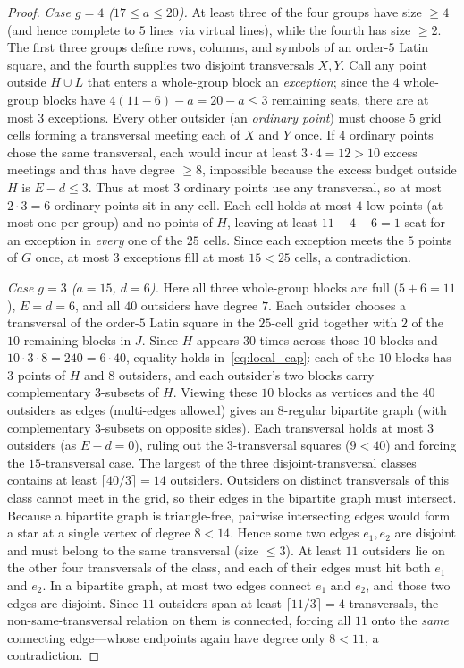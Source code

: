 \documentclass[11pt,a4paper]{article}
\theoremstyle{definition}
\theoremstyle{remark}
\begin{document}
\begin{proof}
\emph{Case $g = 4$ ($17 \le a \le 20$).} At least three of the four groups have size $\ge 4$ (and hence complete to $5$ lines via virtual lines), while the fourth has size $\ge 2$. The first three groups define rows, columns, and symbols of an order-$5$ Latin square, and the fourth supplies two disjoint transversals $X, Y$. Call any point outside $H \cup L$ that enters a whole-group block an \emph{exception}; since the $4$ whole-group blocks have $4(11-6) - a = 20 - a \le 3$ remaining seats, there are at most $3$ exceptions. Every other outsider (an \emph{ordinary point}) must choose $5$ grid cells forming a transversal meeting each of $X$ and $Y$ once. If $4$ ordinary points chose the same transversal, each would incur at least $3 \cdot 4 = 12 > 10$ excess meetings and thus have degree $\ge 8$, impossible because the excess budget outside $H$ is $E - d \le 3$. Thus at most $3$ ordinary points use any transversal, so at most $2 \cdot 3 = 6$ ordinary points sit in any cell. Each cell holds at most $4$ low points (at most one per group) and no points of $H$, leaving at least $11 - 4 - 6 = 1$ seat for an exception in \emph{every} one of the $25$ cells. Since each exception meets the $5$ points of $G$ once, at most $3$ exceptions fill at most $15 < 25$ cells, a contradiction.

\emph{Case $g = 3$ ($a = 15$, $d = 6$).} Here all three whole-group blocks are full ($5 + 6 = 11$), $E = d = 6$, and all $40$ outsiders have degree $7$. Each outsider chooses a transversal of the order-$5$ Latin square in the $25$-cell grid together with $2$ of the $10$ remaining blocks in $J$. Since $H$ appears $30$ times across those $10$ blocks and $10 \cdot 3 \cdot 8 = 240 = 6 \cdot 40$, equality holds in~\eqref{eq:local_cap}: each of the $10$ blocks has $3$ points of $H$ and $8$ outsiders, and each outsider's two blocks carry complementary $3$-subsets of $H$. Viewing these $10$ blocks as vertices and the $40$ outsiders as edges (multi-edges allowed) gives an $8$-regular bipartite graph (with complementary $3$-subsets on opposite sides). Each transversal holds at most $3$ outsiders (as $E - d = 0$), ruling out the $3$-transversal squares ($9 < 40$) and forcing the $15$-transversal case. The largest of the three disjoint-transversal classes contains at least $\lceil 40/3 \rceil = 14$ outsiders. Outsiders on distinct transversals of this class cannot meet in the grid, so their edges in the bipartite graph must intersect. Because a bipartite graph is triangle-free, pairwise intersecting edges would form a star at a single vertex of degree $8 < 14$. Hence some two edges $e_1, e_2$ are disjoint and must belong to the same transversal (size $\le 3$). At least $11$ outsiders lie on the other four transversals of the class, and each of their edges must hit both $e_1$ and $e_2$. In a bipartite graph, at most two edges connect $e_1$ and $e_2$, and those two edges are disjoint. Since $11$ outsiders span at least $\lceil 11/3 \rceil = 4$ transversals, the non-same-transversal relation on them is connected, forcing all $11$ onto the \emph{same} connecting edge—whose endpoints again have degree only $8 < 11$, a contradiction.
\end{proof}
\end{document}

